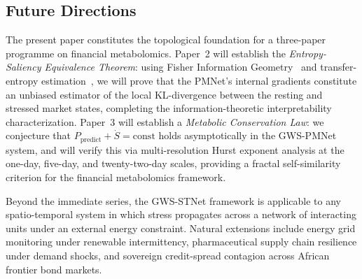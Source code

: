 \documentclass[11pt,a4paper]{article}  %
\theoremstyle{plain}
\theoremstyle{definition}
\theoremstyle{remark}
\begin{document}
\subsection*{Future Directions}

The present paper constitutes the topological foundation for a
three-paper programme on financial metabolomics. Paper~2 will
establish the \emph{Entropy-Saliency Equivalence Theorem}: using
Fisher Information Geometry~\cite{Amari2016} and transfer-entropy
estimation~\cite{Schreiber2000}, we will prove that the PMNet's
internal gradients constitute an unbiased estimator of the local
KL-divergence between the resting and stressed market states,
completing the information-theoretic interpretability characterization.
Paper~3 will establish a \emph{Metabolic Conservation Law}: we
conjecture that $P_{\mathrm{predict}} + \dot{S} = \mathrm{const}$
holds asymptotically in the GWS-PMNet system, and will verify
this via multi-resolution Hurst exponent analysis at the
one-day, five-day, and twenty-two-day scales, providing a fractal
self-similarity criterion for the financial metabolomics framework.

Beyond the immediate series, the GWS-STNet framework is applicable
to any spatio-temporal system in which stress propagates across
a network of interacting units under an external energy constraint.
Natural extensions include energy grid monitoring under
renewable intermittency, pharmaceutical supply chain resilience
under demand shocks, and sovereign credit-spread contagion
across African frontier bond markets.
\end{document}
